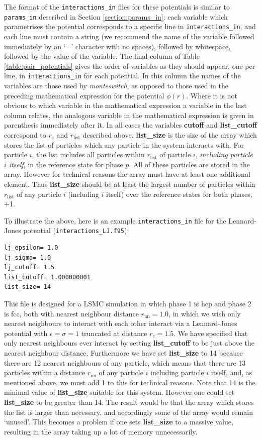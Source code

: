 \documentclass{report}
\begin{document}
The format of the \texttt{interactions\_in} files for these potentials is similar to \texttt{params\_in} described in Section \ref{section:params_in}:
each variable which parametrises the potential corresponds to a specific line in \texttt{interactions\_in}, and each line must contain a string
(we recommend the name of the variable followed immediately by an `=' character with no spaces), followed by whitespace, followed by the value
of the variable. The final column of Table \ref{table:pair_potentials} gives the order of variables as they should appear, one per line, in
\texttt{interactions\_in} for each potential. In this column the names of the variables are those used by \emph{monteswitch}, as opposed to those
used in the preceding mathematical expression for the potential $\phi(r)$. Where it is not obvious to which variable in the mathematical expression
a variable in the last column relates, the analogous variable in the mathematical expression is given in parenthesis immediately after it. In all
cases the variables \textbf{cutoff} and \textbf{list\_cutoff} correspond to $r_{\text{c}}$ and $r_{\text{list}}$ described above. 
%
\textbf{list\_size} is the size of the array which stores the list of particles which any particle in the system interacts with. For particle $i$,
the list includes all particles within $r_{\text{list}}$ of particle $i$, \emph{including particle $i$ itself}, in the reference state for phase $p$. All
of these particles are stored in the array. However for technical reasons the array must have at least one additional element. Thus
\textbf{list\_size} should be at least the largest number of particles within $r_{\text{list}}$ of any particle $i$ (including $i$ itself) over the
reference states for both phases, +1. 

To illustrate the above, here is an example \texttt{interactions\_in} file for the Lennard-Jones potential (\texttt{interactions\_LJ.f95}):
\begin{verbatim}
lj_epsilon= 1.0
lj_sigma= 1.0
lj_cutoff= 1.5
list_cutoff= 1.000000001
list_size= 14
\end{verbatim}
This file is designed for a LSMC simulation in which phase 1 is hcp and phase 2 is fcc, both with nearest neighbour distance $r_{\text{nn}}=1.0$, in
which we wish only nearest neighbours to interact with each other interact via a Lennard-Jones potential with $\epsilon=\sigma=1$ truncated at
distance $r_{\text{c}}=1.5$. We have specified that only nearest neighbours ever interact by setting \textbf{list\_cutoff} to be just above 
the nearest neighbour distance. Furthermore we have set \textbf{list\_size} to 14 because there are 12 nearest neighbours of any particle, 
which means that there are 13 particles within a distance $r_{\text{nn}}$ of any particle $i$ including particle $i$ itself, and, as mentioned above, 
we must add 1 to this for technical reasons. 
Note that 14 is the minimal value of \textbf{list\_size} suitable for this system. However one could set \textbf{list\_size} 
to be greater than 14. The result would be that the array which stores the list is larger than necessary, and accordingly some of the array would
remain `unused'. This becomes a problem if one sets \textbf{list\_size} to a massive value, resulting in the array taking up a lot of memory
unnecessarily.
\end{document}
